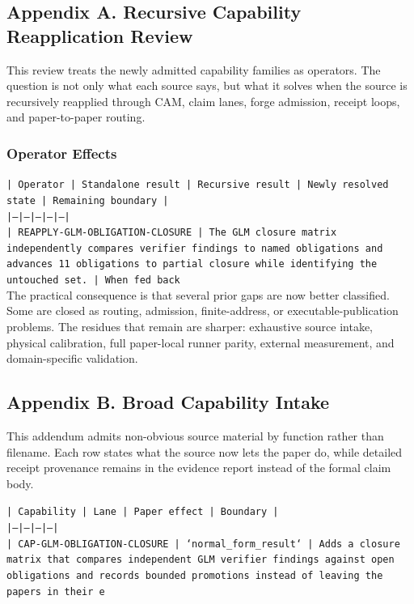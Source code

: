\documentclass[11pt]{article}
\begin{document}
\subsection*{Appendix A. Recursive Capability Reapplication Review}

This review treats the newly admitted capability families as operators. The question is not only what each source says, but what it solves when the source is recursively reapplied through CAM, claim lanes, forge admission, receipt loops, and paper-to-paper routing.

\subsubsection*{Operator Effects}

\noindent\texttt{| Operator | Standalone result | Recursive result | Newly resolved state | Remaining boundary |}\\
\noindent\texttt{|---|---|---|---|---|}\\
\noindent\texttt{| REAPPLY-GLM-OBLIGATION-CLOSURE | The GLM closure matrix independently compares verifier findings to named obligations and advances 11 obligations to partial closure while identifying the untouched set. | When fed back }\\

The practical consequence is that several prior gaps are now better classified. Some are closed as routing, admission, finite-address, or executable-publication problems. The residues that remain are sharper: exhaustive source intake, physical calibration, full paper-local runner parity, external measurement, and domain-specific validation.

\subsection*{Appendix B. Broad Capability Intake}

This addendum admits non-obvious source material by function rather than filename. Each row states what the source now lets the paper do, while detailed receipt provenance remains in the evidence report instead of the formal claim body.

\noindent\texttt{| Capability | Lane | Paper effect | Boundary |}\\
\noindent\texttt{|---|---|---|---|}\\
\noindent\texttt{| CAP-GLM-OBLIGATION-CLOSURE | `normal\_form\_result` | Adds a closure matrix that compares independent GLM verifier findings against open obligations and records bounded promotions instead of leaving the papers in their e}\\
\end{document}
